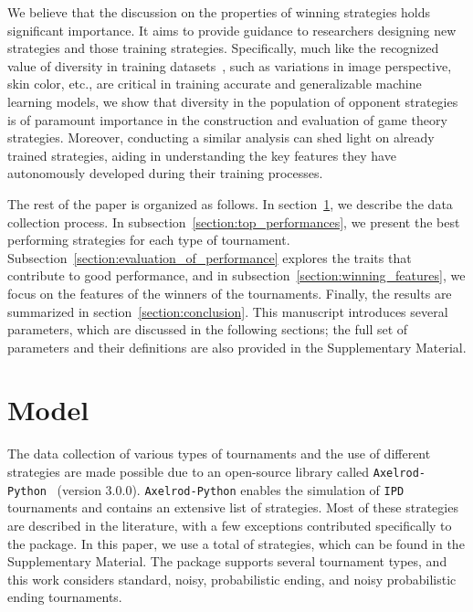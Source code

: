 \documentclass{article}
\newcommand{\numberofstrategies}{}
\def\axelrod{\texttt{Axelrod-Python}}
\def\IPD{\texttt{IPD}}
\begin{document}
We believe that the discussion on the properties of winning strategies holds
significant importance. It aims to provide guidance to researchers designing new
strategies and those training strategies. Specifically, much like the recognized
value of diversity in training datasets~\cite{Gong:IEEE:2019}, such as
variations in image perspective, skin color, etc., are critical in training
accurate and generalizable machine learning models, we show that diversity in
the population of opponent strategies is of paramount importance in the
construction and evaluation of game theory strategies. Moreover, conducting a
similar analysis can shed light on already trained strategies, aiding in
understanding the key features they have autonomously developed during their
training processes.

The rest of the paper is organized as follows. In
section~\ref{section:data_collection}, we describe the data collection process.
In subsection~\ref{section:top_performances}, we present the best performing
strategies for each type of tournament.
Subsection~\ref{section:evaluation_of_performance} explores the traits that
contribute to good performance, and in
subsection~\ref{section:winning_features}, we focus on the features of the
winners of the tournaments. Finally, the results are summarized in
section~\ref{section:conclusion}. This manuscript introduces several parameters,
which are discussed in the following sections; the full set of parameters and
their definitions are also provided in the Supplementary Material.

\section{Model}\label{section:data_collection}

The data collection of various types of tournaments and the use of different
strategies are made possible due to an open-source library called \axelrod{}~\cite{axelrodproject}
(version 3.0.0). \axelrod{} enables the simulation of \IPD{}
tournaments and contains an extensive list of strategies. Most of these
strategies are described in the literature, with a few exceptions contributed
specifically to the package. In this paper, we use a total of
\numberofstrategies strategies, which can be found in the Supplementary
Material. The package supports several tournament types, and this work considers
standard, noisy, probabilistic ending, and noisy probabilistic ending
tournaments.
\end{document}
